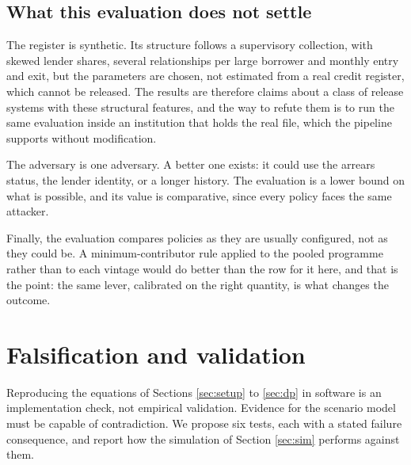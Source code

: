 \documentclass[11pt,a4paper]{article}
\theoremstyle{plain}
\theoremstyle{definition}
\begin{document}
\subsection{What this evaluation does not settle}\label{sec:eval-limits}

The register is synthetic. Its structure follows a supervisory collection, with
skewed lender shares, several relationships per large borrower and monthly entry and
exit, but the parameters are chosen, not estimated from a real credit register,
which cannot be released. The results are therefore claims about a class of release
systems with these structural features, and the way to refute them is to run the
same evaluation inside an institution that holds the real file, which the pipeline
supports without modification.

The adversary is one adversary. A better one exists: it could use the arrears
status, the lender identity, or a longer history. The evaluation is a lower bound on
what is possible, and its value is comparative, since every policy faces the same
attacker.

Finally, the evaluation compares policies as they are usually configured, not as
they could be. A minimum-contributor rule applied to the pooled programme rather
than to each vintage would do better than the row for it here, and that is the
point: the same lever, calibrated on the right quantity, is what changes the
outcome.




\section{Falsification and validation}\label{sec:falsify}

Reproducing the equations of Sections \ref{sec:setup} to \ref{sec:dp} in
software is an implementation check, not empirical validation. Evidence for the
scenario model must be capable of contradiction. We propose six tests, each
with a stated failure consequence, and report how the simulation of Section
\ref{sec:sim} performs against them.
\end{document}
